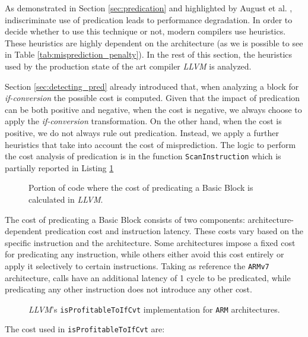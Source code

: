 As demonstrated in Section \ref{sec:predication} and highlighted by August et al. \cite{August98}, indiscriminate use of predication leads to performance degradation.
In order to decide whether to use this technique or not, modern compilers use heuristics. These heuristics are highly  dependent on the architecture (as we is possible to see in Table \ref{tab:misprediction_penalty}). In the rest of this section, the heuristics used by the production state of the art compiler \textit{LLVM} is analyzed.

Section \ref{sec:detecting_pred} already introduced that, when analyzing a block for \textit{if-conversion} the possible cost is computed. Given that the impact of predication can be both positive and negative, when the cost is negative, we always choose to apply the \textit{if-conversion} transformation. On the other hand, when the cost is positive, we do not always rule out predication. Instead, we apply a further heuristics that take into account the cost of misprediction.
The logic to perform the cost analysis of predication is in the function \texttt{ScanInstruction} which is partially reported in Listing \ref{lst:predication_cost}

\begin{figure}[H]
    \centering
    
    \caption{Portion of code where the cost of predicating a Basic Block is calculated in \textit{LLVM}.}
    \label{lst:predication_cost}
\end{figure}

The cost of predicating a Basic Block consists of two components: architecture-dependent predication cost and instruction latency. These costs vary based on the specific instruction and the architecture. Some architectures impose a fixed cost for predicating any instruction, while others either avoid this cost entirely or apply it selectively to certain instructions. Taking as reference the \texttt{ARMv7} architecture, calls have an additional latency of 1 cycle to be predicated, while predicating any other instruction does not introduce any other cost.

\begin{figure}[H]
    \centering
    
    \caption{\textit{LLVM}'s \texttt{isProfitableToIfCvt} implementation for \texttt{ARM} architectures.}
    \label{lst:predications_heuristic}
\end{figure}

The cost used in \texttt{isProfitableToIfCvt} are:

